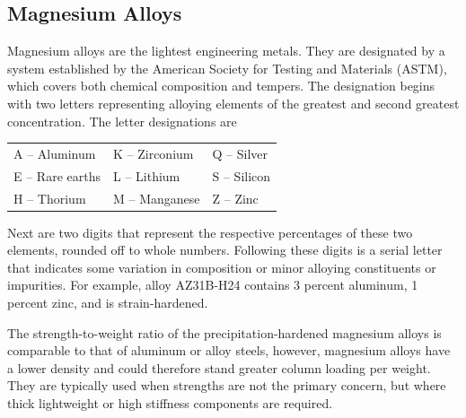 \documentclass[
10pt,
a4paper,
openany,
svgnames,
]{book}
\begin{document}
\subsection{Magnesium Alloys}

Magnesium alloys are the lightest engineering metals. They are designated by a system established by the American Society for Testing and Materials (ASTM), which covers both chemical composition and tempers. The designation begins with two letters representing alloying elements of the greatest and second greatest concentration. The letter designations are

\begin{table}[h]
  \centering
  \begin{tabular}{ lll }
    \hline
    A – Aluminum & K – Zirconium & Q – Silver \\
    E – Rare earths & L – Lithium & S – Silicon \\
    H – Thorium & M – Manganese & Z – Zinc \\
    \hline
  \end{tabular}
\end{table}

Next are two digits that represent the respective percentages of these two elements, rounded off to whole numbers. Following these digits is a serial letter that indicates some variation in composition or minor alloying constituents or impurities. For example, alloy AZ31B-H24 contains 3 percent aluminum, 1 percent zinc, and is strain-hardened.

The strength-to-weight ratio of the precipitation-hardened magnesium alloys is comparable to that of aluminum or alloy steels, however, magnesium alloys have a lower density and could therefore stand greater column loading per weight. They are typically used when strengths are not the primary concern, but where thick lightweight or high stiffness components are required.
\end{document}
